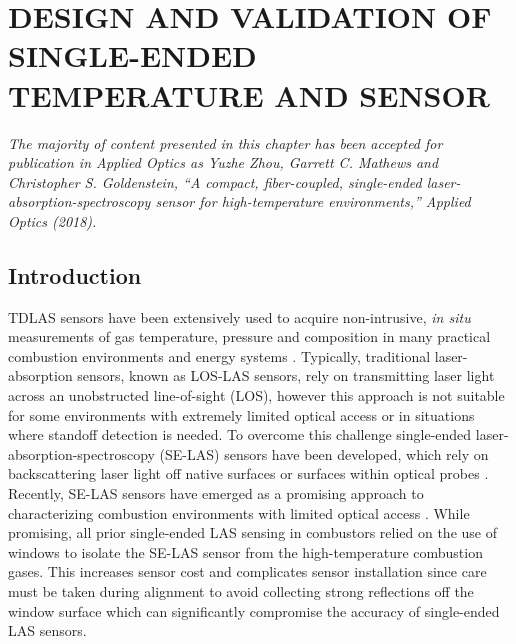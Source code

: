 \chapter{DESIGN AND VALIDATION OF SINGLE-ENDED TEMPERATURE AND  SENSOR }

\vspace{3mm}

\textit{The majority of content presented in this chapter has been accepted for publication in Applied Optics as Yuzhe Zhou, Garrett C. Mathews and Christopher S. Goldenstein, ``A compact, fiber-coupled, single-ended laser-absorption-spectroscopy sensor for high-temperature environments,'' Applied Optics (2018).}

\section{Introduction}
TDLAS sensors have been extensively used to acquire non-intrusive, \textit{in situ} measurements of gas temperature, pressure and composition in many practical combustion environments and energy systems \cite{Goldenstein2017, Ma2013, Caswell2013,Stritzke2015,Bürkle2018, Witzel2013,Makowiecki2017,rieker2009calibration,Li2011}. Typically, traditional laser-absorption sensors, known as LOS-LAS sensors, rely on transmitting laser light across an unobstructed line-of-sight (LOS), however this approach is not suitable for some environments with extremely limited optical access or in situations where standoff detection is needed. To overcome this challenge single-ended laser-absorption-spectroscopy (SE-LAS) sensors have been developed, which rely on backscattering laser light off native surfaces \cite{Dubinsky1998,Wainner2002,Wang2015,Goldenstein:16,Peng:16,Peng2018,Rein2017} or surfaces within optical probes \cite{RIEKER20073041,Rein:10,Chen2010,0957-0233-25-11-115501,GIRARD2017158}. Recently, SE-LAS sensors have emerged as a promising approach to characterizing combustion environments with limited optical access \cite{Goldenstein2017}. While promising, all prior single-ended LAS sensing in combustors relied on the use of windows to isolate the SE-LAS sensor from the high-temperature combustion gases. This increases sensor cost and complicates sensor installation since care must be taken during alignment to avoid collecting strong reflections off the window surface which can significantly compromise the accuracy of single-ended LAS sensors.

